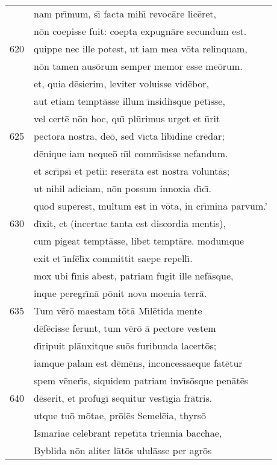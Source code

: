 \documentclass[paper=6in:9in,pagesize=pdftex,
               headinclude=on,footinclude=on,12pt]{scrbook}
\begin{document}
\begin{longtable}[p]{ r l }
 & nam pr\={\i}mum, s\={\i} facta mih\={\i} revoc\=are lic\=eret,\\ 
 & n\=on coepisse fuit: coepta expugn\=are secundum est.\\ 
620 & quippe nec ille potest, ut iam mea v\=ota relinquam,\\ 
 & n\=on tamen aus\=orum semper memor esse me\=orum.\\ 
 & et, quia d\=esierim, leviter voluisse vid\=ebor,\\ 
 & aut etiam tempt\=asse illum \={\i}nsidi\={\i}sque pet\={\i}sse,\\ 
 & vel cert\=e n\=on hoc, qu\={\i} pl\=urimus urget et \=urit\\ 
625 & pectora nostra, de\=o, sed v\={\i}cta lib\={\i}dine cr\=edar;\\ 
 & d\=enique iam neque\=o n\={\i}l comm\={\i}sisse nefandum.\\ 
 & et scr\={\i}ps\={\i} et peti\={\i}: reser\=ata est nostra volunt\=as;\\ 
 & ut nihil adiciam, n\=on possum innoxia d\={\i}c\={\i}.\\ 
 & quod superest, multum est in v\=ota, in cr\={\i}mina parvum.'\\ 
630 & d\={\i}xit, et (incertae tanta est discordia mentis),\\ 
 & cum pigeat tempt\=asse, libet tempt\=are. modumque\\ 
 & exit et \={\i}nf\=el\={\i}x committit saepe repell\={\i}.\\ 
 & mox ubi f\={\i}nis abest, patriam fugit ille nef\=asque,\\ 
 & inque peregr\={\i}n\=a p\=onit nova moenia terr\=a.\\ 
635 & \indent Tum v\=er\=o maestam t\=ot\=a M\={\i}l\=etida mente\\ 
 & d\=ef\=ecisse ferunt, tum v\=er\=o \=a pectore vestem\\ 
 & d\={\i}ripuit pl\=anxitque su\=os furibunda lacert\=os;\\ 
 & iamque palam est d\=em\=ens, inconcessaeque fat\=etur\\ 
 & spem v\=ener\={\i}s, siquidem patriam inv\={\i}s\=osque pen\=at\=es\\ 
640 & d\=eserit, et profug\={\i} sequitur vest\={\i}gia fr\=atris.\\ 
 & utque tu\=o m\=otae, pr\=ol\=es Semel\=eia, thyrs\=o\\ 
 & Ismariae celebrant repet\={\i}ta triennia bacchae,\\ 
 & Byblida n\=on aliter l\=at\=os ulul\=asse per agr\=os\\ 

\end{longtable}
\end{document}
